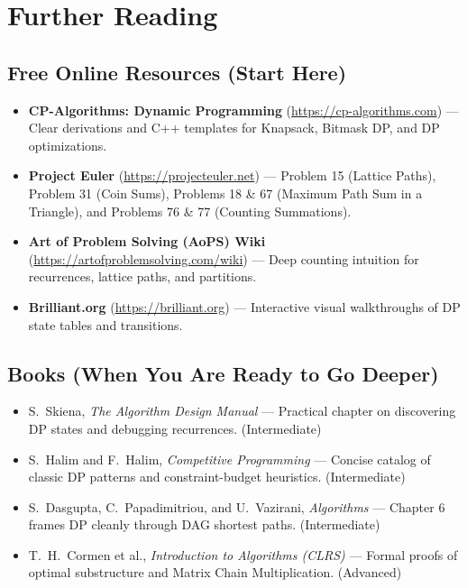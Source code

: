 \documentclass[11pt,a4paper]{article}
\theoremstyle{definition}
\begin{document}
\section{Further Reading}

\subsection*{Free Online Resources (Start Here)}
\begin{itemize}
    \item \textbf{CP-Algorithms: Dynamic Programming} (\url{https://cp-algorithms.com}) --- Clear derivations and C++ templates for Knapsack, Bitmask DP, and DP optimizations.
    \item \textbf{Project Euler} (\url{https://projecteuler.net}) --- Problem 15 (Lattice Paths), Problem 31 (Coin Sums), Problems 18 \& 67 (Maximum Path Sum in a Triangle), and Problems 76 \& 77 (Counting Summations).
    \item \textbf{Art of Problem Solving (AoPS) Wiki} (\url{https://artofproblemsolving.com/wiki}) --- Deep counting intuition for recurrences, lattice paths, and partitions.
    \item \textbf{Brilliant.org} (\url{https://brilliant.org}) --- Interactive visual walkthroughs of DP state tables and transitions.
\end{itemize}

\subsection*{Books (When You Are Ready to Go Deeper)}
\begin{itemize}
    \item S.\ Skiena, \emph{The Algorithm Design Manual} --- Practical chapter on discovering DP states and debugging recurrences. (Intermediate)
    \item S.\ Halim and F.\ Halim, \emph{Competitive Programming} --- Concise catalog of classic DP patterns and constraint-budget heuristics. (Intermediate)
    \item S.\ Dasgupta, C.\ Papadimitriou, and U.\ Vazirani, \emph{Algorithms} --- Chapter 6 frames DP cleanly through DAG shortest paths. (Intermediate)
    \item T.\ H.\ Cormen et al., \emph{Introduction to Algorithms (CLRS)} --- Formal proofs of optimal substructure and Matrix Chain Multiplication. (Advanced)
\end{itemize}
\end{document}
